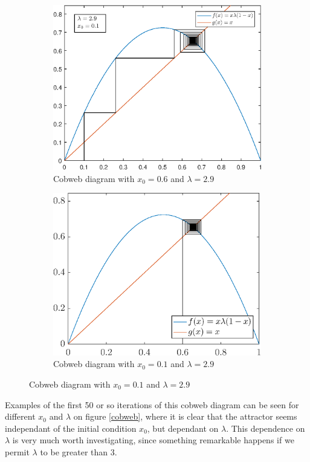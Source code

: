 \documentclass[12pt,oneside,a4paper]{article}
\numberwithin{equation}{section}
\begin{document}
{{{{\begin{figure}[h]
\begin{subfigure}{0.45\textwidth}
		\includegraphics[width=\linewidth]{cobweb_x1_l29_iter50}
		\caption{Cobweb diagram with $x_0=0.6$ and $\lambda=2.9$}
	\end{subfigure}\hfill
	\begin{subfigure}{.45\textwidth}
		\centering
		\includegraphics[width=\linewidth]{cobweb_x6_l29_iter50}
		\caption{Cobweb diagram with $x_0=0.1$ and $\lambda=2.9$}
	\end{subfigure}
\end{figure}
Examples of the first 50 or so iterations of this cobweb diagram can be seen for different $x_0$ and $\lambda$ on figure \ref{cobweb}, where it is clear that the attractor seems independant of the initial condition $x_0$, but dependant on $\lambda$. This dependence on $\lambda$ is very much worth investigating, since something remarkable happens if we permit $\lambda$ to be greater than 3.
}}}}
\end{document}

